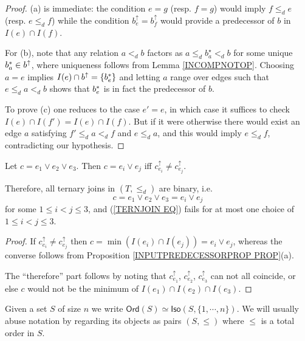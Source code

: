 \documentclass[a4paper,10pt]{article}%
\begin{document}
\begin{proof}
(a) is immediate: the condition $e = g$ (resp. $f = g$) would imply $f \leq_d e$ (resp. $e \leq_d f$)
while the condition $b^{\uparrow}_e = b^{\uparrow}_f$ would provide a predecessor of $b$ in $I(e) \cap I(f)$. 

For (b), note that any relation $a <_d b$ factors as 
$a \leq_d b^{\star}_a <_d b$ for some unique $b^{\**}_a \in b^{\uparrow}$, where uniqueness follows from Lemma \ref{INCOMPNOTOP}. Choosing $a=e$ implies $I(e) \cap b^{\uparrow} = \{b^{\**}_e\}$ and letting $a$ range over edges such that $e \leq_d a <_d b$ shows that $b^{\**}_e$ is in fact the predecessor of $b$.

To prove (c) one reduces to the case $e'=e$, in which case it suffices to check $I(e) \cap I(f') = I(e) \cap I(f)$. But if it were otherwise there would exist an edge $a$ satisfying
$f' \leq_d a <_d f$ and $e \leq_d a$, and this would imply $e \leq_d f$, contradicting our hypothesis.
\end{proof}



\begin{proposition}
\label{TERNARYJOIN PROP}
Let $c = e_1 \vee e_2 \vee e_3$.
Then $c = e_i \vee e_j$ iff $c^{\uparrow}_{e_i} \neq c^{\uparrow}_{e_j}$.

Therefore, all ternary joins in $(T,\leq_d)$ are binary, i.e.
\begin{equation}\label{TERNJOIN EQ}
	c = e_1 \vee e_2 \vee e_3 = e_i \vee e_j
\end{equation}
for some $1\leq i <j \leq 3$, and
(\ref{TERNJOIN EQ}) fails for 
 at most one choice of $1\leq i <j \leq 3$.
\end{proposition}


\begin{proof}
If $c^{\uparrow}_{e_i} \neq c^{\uparrow}_{e_j}$ then
$c = \min\left(I(e_i) \cap I(e_j)\right) = e_i \vee e_j$, whereas the converse follows from Proposition \ref{INPUTPREDECESSORPROP PROP}(a).

The ``therefore'' part follows by noting that 
$c^{\uparrow}_{e_1}$, $c^{\uparrow}_{e_2}$, $c^{\uparrow}_{e_3}$
can not all coincide, or else $c$ would not be the minimum of
$I(e_1) \cap I(e_2) \cap I(e_3)$. 
\end{proof}

\begin{notation}
	Given a set $S$ of size $n$ we write
	$\textsf{Ord}(S) \simeq \mathsf{Iso}(S,\{1,\cdots,n\})$. We will usually abuse notation by regarding its objects as pairs $(S,\leq)$ where $\leq$ is a total order in $S$.
\end{notation}
\end{document}
